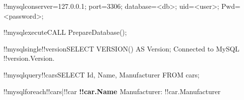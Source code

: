 \documentclass[a4paper]{article}
\begin{document}
!!mysqlcon{server=127.0.0.1; port=3306; database=<db>; uid=<user>; Pwd=<password>;}

!!mysqlexecute{CALL PrepareDatabase();}  %

!!mysqlsingle{!!version}{SELECT VERSION() AS Version;}
Connected to MySQL !!version.Version.  %

!!mysqlquery{!!cars}{SELECT Id, Name, Manufacturer FROM cars;}

!!mysqlforeach{!!cars|!!car}{
\textbf{!!car.Name \label{!!car.Id}}
Manufacturer: !!car.Manufacturer
}

%  
\end{document}
